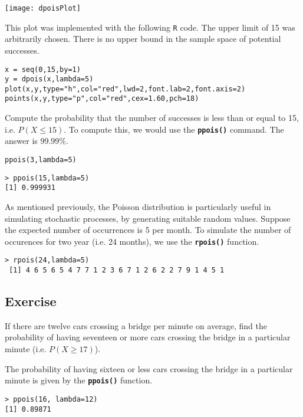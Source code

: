  \begin{center}
 \texttt{[image: dpoisPlot]}
 \end{center}
 
This plot was implemented with the following \texttt{R} code.
The upper limit of 15 was arbitrarily chosen. There is no upper bound in the sample space of potential successes.
\begin{framed}
\begin{verbatim}
x = seq(0,15,by=1)
y = dpois(x,lambda=5)
plot(x,y,type="h",col="red",lwd=2,font.lab=2,font.axis=2)
points(x,y,type="p",col="red",cex=1.60,pch=18)
\end{verbatim}
\end{framed}
Compute the probability that the number of successes is less than or equal to 15, i.e. $P(X \leq 15)$. To compute this, we would use the \textbf{\texttt{ppois()}} command. The answer is 99.99\%.

\begin{framed}
\begin{verbatim}
ppois(3,lambda=5)
\end{verbatim}
\end{framed}
\begin{verbatim}
> ppois(15,lambda=5)
[1] 0.999931
\end{verbatim}

As mentioned previously, the Poisson distribution is particularly useful in simulating stochastic processes, by generating suitable random values.
Suppose the expected number of occurrences is 5 per month. To simulate the number of occurences for two year (i.e. 24 months), we use the \texttt{\textbf{rpois()}} function.

\begin{verbatim}
> rpois(24,lambda=5)
 [1] 4 6 5 6 5 4 7 7 1 2 3 6 7 1 2 6 2 2 7 9 1 4 5 1
\end{verbatim}

\subsection{Exercise}

If there are twelve cars crossing a bridge per minute on average, find the probability of having seventeen or more cars crossing the bridge in a particular minute (i.e. $P(X\geq 17)$). 

The probability of having sixteen or less cars crossing the bridge in a particular minute is given by the  \texttt{\textbf{ppois()}} function. 
\begin{verbatim}
> ppois(16, lambda=12)   
[1] 0.89871 
\end{verbatim}

